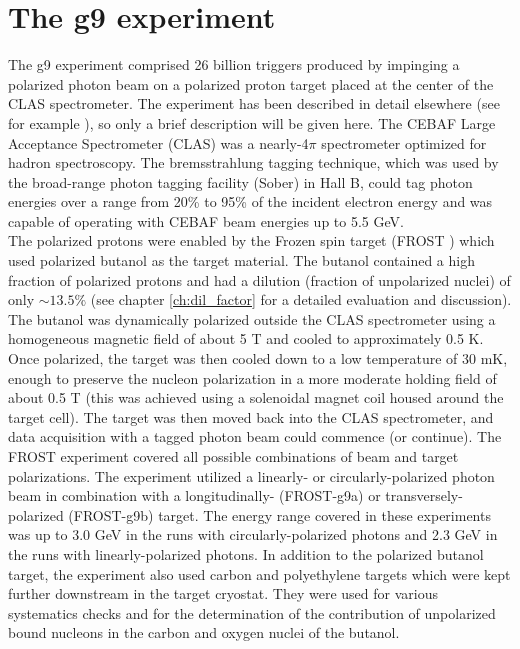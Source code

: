\section{The g9 experiment}
The g9 experiment comprised 26 billion triggers produced by impinging  a  polarized photon beam on a polarized proton target placed at the center of the CLAS spectrometer. The experiment has been described in detail elsewhere (see for example \cite{Strauch_2014}), so only a brief description will be given here. 
 The CEBAF Large Acceptance Spectrometer (CLAS)\cite{CLAS} was a nearly-4$\pi$ spectrometer optimized for hadron spectroscopy. The bremsstrahlung tagging technique, which was used by the broad-range photon tagging facility (Sober\cite{Sober_2000}) in Hall B, could tag photon energies over a range from 20\% to 95\% of the incident electron energy and was capable of operating with CEBAF beam energies up to 5.5 GeV. \\
The polarized protons were enabled by the Frozen spin target (FROST \cite{Keith_2012}) which used polarized butanol as the target material.
The butanol contained a high fraction of polarized protons and had a dilution (fraction of unpolarized nuclei) of only $\sim 13.5\%$ (see chapter \ref{ch:dil_factor} for a detailed evaluation and discussion).
 The butanol was dynamically polarized outside the CLAS spectrometer using a homogeneous magnetic field of about 5 T and cooled to approximately 0.5 K. Once polarized, the target was then cooled down to a low temperature of 30 mK, enough to preserve the nucleon polarization in a more moderate holding field of about 0.5 T (this was achieved using a solenoidal magnet coil housed around the target cell). The target was then moved back into the CLAS spectrometer, and data acquisition with a tagged photon beam could commence (or continue). The FROST experiment covered all possible combinations of beam and target polarizations. The experiment utilized a linearly- or circularly-polarized photon beam in combination with a longitudinally- (FROST-g9a) or transversely-polarized (FROST-g9b) target. The energy range covered in these experiments was up to 3.0 GeV in the runs with circularly-polarized photons and 2.3 GeV in the runs with linearly-polarized photons. In addition to the polarized butanol target, the experiment also used carbon and polyethylene targets which were kept further downstream in the target cryostat. They were used for various systematics checks and for the determination of the contribution of unpolarized bound nucleons in the carbon and oxygen nuclei of the butanol.
